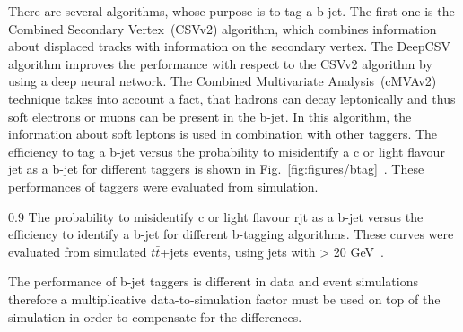 There are several algorithms, whose purpose is to tag a b-jet. The first one is the Combined Secondary Vertex~(CSVv2) algorithm, which combines information about displaced tracks with information on the secondary vertex. The DeepCSV algorithm improves the performance with respect to the CSVv2 algorithm by using a deep neural network. The Combined Multivariate Analysis~(cMVAv2) technique takes into account a fact, that hadrons can decay leptonically and thus soft electrons or muons can be present in the b-jet. In this algorithm, the information about soft leptons is used in combination with other taggers. The efficiency to tag a b-jet versus the probability to misidentify a c or light flavour jet as a b-jet for different taggers is shown in Fig.~\ref{fig:figures/btag}~\cite{Sirunyan:2017ezt}. These performances of taggers were evaluated from simulation.


                 {0.9}       %
                 { The probability to misidentify c or light flavour rjt as a b-jet versus the efficiency to identify a b-jet for different b-tagging algorithms. These curves were evaluated from simulated $t\bar{t}$+jets events, using jets with \pt > 20 GeV~\cite{Sirunyan:2017ezt}. }

The performance of b-jet taggers is different in data and event simulations therefore a multiplicative data-to-simulation factor must be used on top of the simulation in order to compensate for the differences.
